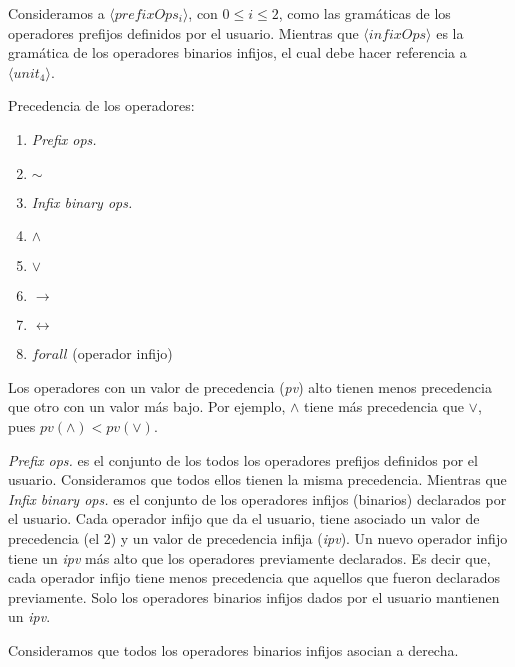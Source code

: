 \documentclass[a4paper,11pt]{article}
\begin{document}
Consideramos a $\langle prefixOps_{i} \rangle$, con $0 \leq i \leq 2$, como las gramáticas de los operadores prefijos definidos por el usuario.
Mientras que $\langle infixOps \rangle$ es la gramática de los operadores binarios infijos, el cual debe hacer referencia a $\langle unit_{4} \rangle$.

Precedencia de los operadores:
\begin{enumerate}
  \item \textit{Prefix ops.}
  \item $\sim$
  \item \textit{Infix binary ops.}
  \item $\wedge$
  \item $\vee$
  \item $\rightarrow$
  \item $\leftrightarrow$
  \item $forall$ (operador infijo)
\end{enumerate}

Los operadores con un valor de precedencia (\textit{pv}) alto tienen menos precedencia que otro con un valor más bajo.
Por ejemplo, $\wedge$ tiene más precedencia que $\vee$, pues $pv (\wedge) < pv (\vee)$.

\textit{Prefix ops.} es el conjunto de los todos los operadores prefijos definidos por el usuario. Consideramos
que todos ellos tienen la misma precedencia.
Mientras que \textit{Infix binary ops.} es el conjunto de los operadores infijos (binarios) declarados por el usuario.
Cada operador infijo que da el usuario, tiene asociado un valor de precedencia (el 2) y un valor de precedencia infija (\textit{ipv}).
Un nuevo operador infijo tiene un \textit{ipv} más alto que los operadores previamente declarados.
Es decir que, cada operador infijo tiene menos precedencia que aquellos que fueron declarados previamente.
Solo los operadores binarios infijos dados por el usuario mantienen un \textit{ipv}.

Consideramos que todos los operadores binarios infijos asocian a derecha.
\end{document}
